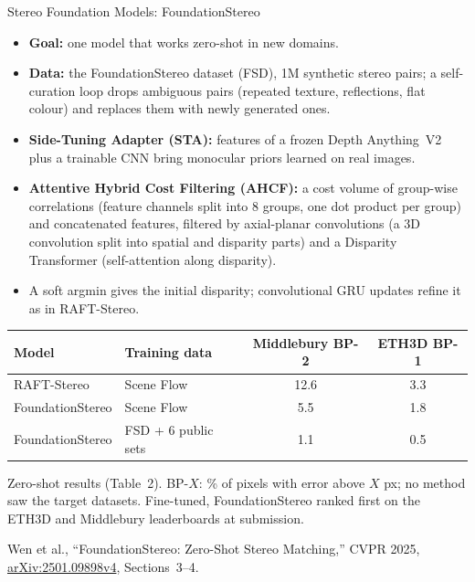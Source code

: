 \begin{frame}{Stereo Foundation Models: FoundationStereo}
  \begin{itemize}\scriptsize\itemsep0.25em
    \item \textbf{Goal:} one model that works zero-shot in new domains.
    \item \textbf{Data:} the FoundationStereo dataset (FSD), 1M synthetic stereo pairs; a self-curation loop drops ambiguous pairs (repeated texture, reflections, flat colour) and replaces them with newly generated ones.
    \item \textbf{Side-Tuning Adapter (STA):} features of a frozen Depth Anything~V2 plus a trainable CNN bring monocular priors learned on real images.
    \item \textbf{Attentive Hybrid Cost Filtering (AHCF):} a cost volume of group-wise correlations (feature channels split into 8 groups, one dot product per group) and concatenated features, filtered by axial-planar convolutions (a 3D convolution split into spatial and disparity parts) and a Disparity Transformer (self-attention along disparity).
    \item A soft argmin gives the initial disparity; convolutional GRU updates refine it as in RAFT-Stereo.
  \end{itemize}
  \vspace{0.1em}
  {\centering\scriptsize
  \begin{tabular}{l l c c}
    \toprule
    \textbf{Model} & \textbf{Training data} & \textbf{Middlebury BP-2} & \textbf{ETH3D BP-1} \\
    \midrule
    RAFT-Stereo & Scene Flow & 12.6 & 3.3 \\
    FoundationStereo & Scene Flow & 5.5 & 1.8 \\
    FoundationStereo & FSD + 6 public sets & 1.1 & 0.5 \\
    \bottomrule
  \end{tabular}\par}
  \vspace{0.2em}
  {\scriptsize Zero-shot results (Table~2). BP-$X$: \% of pixels with error above $X$ px; no method saw the target datasets. Fine-tuned, FoundationStereo ranked first on the ETH3D and Middlebury leaderboards at submission.\par}
  \vspace{0.2em}
  {\scriptsize Wen et al., ``FoundationStereo: Zero-Shot Stereo Matching,'' CVPR 2025, \href{https://arxiv.org/abs/2501.09898v4}{arXiv:2501.09898v4}, Sections~3--4.\par}
\end{frame}

